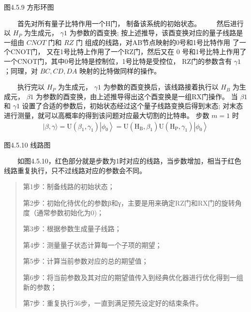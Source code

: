 \documentclass[a4paper,11pt,english]{sphinxmanual}
\let\sphinxpxdimen\pdfpxdimen\else\newdimen\sphinxpxdimen
\begin{document}
\noindent{\hspace*{\fill}\sphinxincludegraphics[width=350\sphinxpxdimen]{{4.5.9}.png}\hspace*{\fill}}

\begin{center}图4.5.9 方形环图
\end{center}
\sphinxAtStartPar
  首先对所有量子比特作用一个H门， 制备该系统的初始状态。
  然后进行以  \(H_{P}\) 为生成元，  \(\gamma 1\) 为参数的酉变换; 按上述推导，该酉变换对应的量子线路是一组由  \(CNOT\) 门和  \(RZ\) 门 组成的线路，对AB节点映射的0号和1号比特作用 了一个CNOT门， 又在1号比特上作用了一个RZ门，然后又在 0 号和1号比特上作用了一个CNOT门，其中0号比特是控制位，1号比特是受控位， RZ门的参数含有  \(\gamma 1\) ；同理，对  \(B C, C D, D A\) 映射的比特做同样的操作。

\sphinxAtStartPar
  执行完以  \(H_{P}\) 为生成元，  \(\gamma 1\) 为参数的酉变换后，该线路接着执行以 \(H_{B}\) 为生成元， \(\beta 1\) 为参数的酉变换，由上述推导得出这个酉变换是一组RX门操作。 当  \(\beta 1\) 和  \(\gamma 1\) 设置了合适的参数后，初始状态经过这个量子线路变换后得到末态; 对末态进行测量，就可以高概率的得到该问题对应最大切割的比特串。 步数  \(m=1\) 时
\begin{equation*}
\begin{split}|\beta, \gamma\rangle=\mathrm{U}\left(\beta_{1}, \gamma_{1}\right)\left|\phi_{0}\right\rangle=\mathrm{U}\left(\mathrm{H}_{\mathrm{B}}, \beta_{1}\right) \mathrm{U}\left(\mathrm{H}_{\mathrm{P}}, \gamma_{1}\right)\left|\phi_{0}\right\rangle\end{split}
\end{equation*}

\begin{center}图4.5.10 线路图
\end{center}
\sphinxAtStartPar
  如图4.5.10，红色部分就是步数为1时对应的线路，当步数增加，相当于红色线路重复执行，只不过线路对应的参数会不同。

\sphinxAtStartPar
{} 
\begin{quote}

\sphinxAtStartPar
第1步：制备线路的初始状态；

\sphinxAtStartPar
第2步：初始化待优化的参数β和γ，主要是用来确定RZ门和RX门的旋转角度（通常参数初始化为0)；

\sphinxAtStartPar
第3步：根据参数生成量子线路；

\sphinxAtStartPar
第4步：测量量子状态计算每一个子项的期望；

\sphinxAtStartPar
第5步：计算当前参数对应的总的期望值；

\sphinxAtStartPar
第6步：将当前参数及其对应的期望值传入到经典优化器进行优化得到一组新的参数；

\sphinxAtStartPar
第7步：重复执行3\sphinxhyphen{}6步，一直到满足预先设定好的结束条件。
\end{quote}
\end{document}
